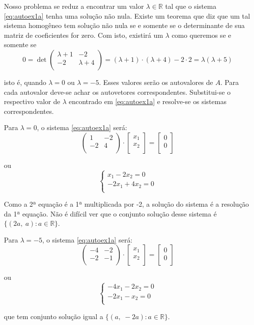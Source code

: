 Nosso problema se reduz a encontrar um valor $\lambda\in\mathbb{R}$ tal que o sistema \eqref{eq:autoex1a} tenha uma solução não nula. Existe um teorema que diz que um tal sistema homogêneo tem solução não nula se e somente se o determinante de sua matriz de coeficientes for zero. Com isto, existirá um $\lambda$ como queremos se e somente se
$$0=\det\begin{pmatrix}\lambda+1 & -2\\-2 & \lambda+4\\ \end{pmatrix}=(\lambda+1)\cdot(\lambda+4)-2\cdot2=\lambda(\lambda+5)$$

isto é, quando $\lambda=0$ ou $\lambda=-5$. Esses valores serão os autovalores de $A$. Para cada autovalor deve-se achar os autovetores correspondentes. Substitui-se o respectivo valor de $\lambda$ encontrado em \eqref{eq:autoex1a} e resolve-se os sistemas correspondentes.

Para $\lambda=0$, o sistema \eqref{eq:autoex1a} será:
$$\begin{pmatrix}1 & -2\\-2 & 4\\ \end{pmatrix}\cdot\begin{bmatrix}x_1\\x_2\\ \end{bmatrix}=\begin{bmatrix}0\\0\\ \end{bmatrix}$$

ou
$$\begin{cases}x_1-2x_2=0\\-2x_1+4x_2=0\\ \end{cases}$$

Como a 2ª equação é a 1ª multiplicada por -2, a solução do sistema é a resolução da 1ª equação. Não é difícil ver que o conjunto solução desse sistema é $\{(2a,\;a):a\in\mathbb{R}\}$.

Para $\lambda=-5$, o sistema \eqref{eq:autoex1a} será:
$$\begin{pmatrix}-4 & -2\\-2 & -1\\ \end{pmatrix}\cdot\begin{bmatrix}x_1\\x_2\\ \end{bmatrix}=\begin{bmatrix}0\\0\\ \end{bmatrix}$$

ou
$$\begin{cases}-4x_1-2x_2=0\\-2x_1-x_2=0\\ \end{cases}$$

que tem conjunto solução igual a $\{(a,\;-2a):a\in\mathbb{R}\}$.
